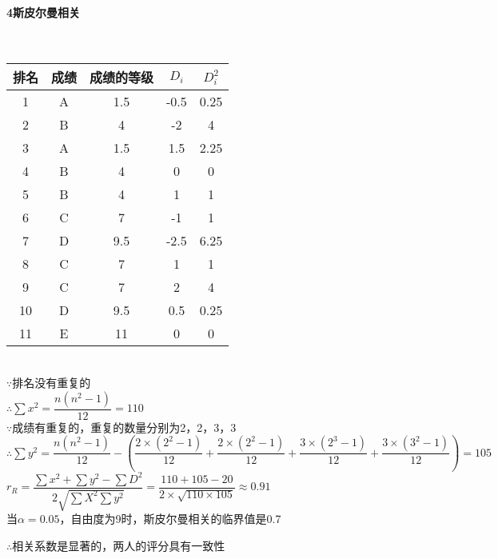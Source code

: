 \documentclass[UTF8]{ctexart}
\begin{document}
\paragraph{4斯皮尔曼相关}
~\\

	\begin{tabular}{ccccc}
		\toprule
		排名 & 成绩 & 成绩的等级 & $D_i$ & $D_i^2$ \\
		\midrule
		1 & A & 1.5 & -0.5 & 0.25 \\
		2 & B & 4 & -2 & 4 \\
		3 & A & 1.5 & 1.5 & 2.25 \\
		4 & B & 4 & 0 & 0 \\
		5 & B & 4 & 1 & 1 \\
		6 & C & 7 & -1 & 1 \\
		7 & D & 9.5 & -2.5 & 6.25 \\
		8 & C & 7 & 1 & 1 \\
		9 & C & 7 & 2 & 4 \\
		10 & D & 9.5 & 0.5 & 0.25 \\
		11 & E & 11 & 0 & 0 \\
		\bottomrule
	\end{tabular}

~\\

$\because$排名没有重复的
\\

$\therefore \sum x^2=\dfrac{n(n^2-1)}{12}=110$
\\

$\because$成绩有重复的，重复的数量分别为2，2，3，3
\\

$\therefore \sum y^2=\dfrac{n(n^2-1)}{12}-\left(\dfrac{2\times(2^2-1)}{12}+\dfrac{2\times(2^2-1)}{12}+\dfrac{3\times(2^3-1)}{12}+\dfrac{3\times (3^2-1)}{12}\right)=105$
\\

$r_R=\dfrac{\sum x^2+\sum y^2 -\sum D^2}{2\sqrt{\sum X^2\sum y^2}}=\dfrac{110+105-20}{2\times \sqrt{110\times 105}}\approx0.91$
\\

当$\alpha=0.05$，自由度为9时，斯皮尔曼相关的临界值是0.7

$\therefore$相关系数是显著的，两人的评分具有一致性
\\
\end{document}
